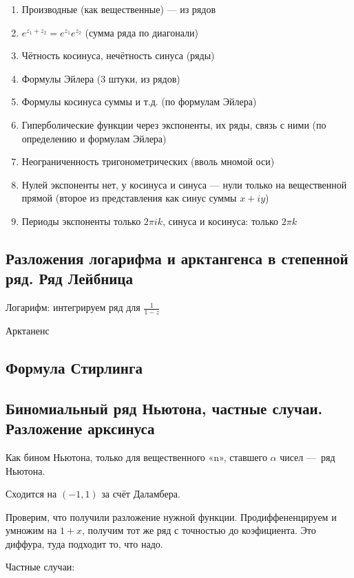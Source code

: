 \documentclass[12pt, a4paper, oneside]{memoir}
\begin{document}
\begin{enumerate}
    \item Производные (как вещественные) — из рядов
    \item $e^{z_1 + z_2} = e^{z_1} e^{z_2}$ (сумма ряда по диагонали)
    \item Чётность косинуса, нечётность синуса (ряды)
    \item Формулы Эйлера (3 штуки, из рядов)
    \item Формулы косинуса суммы и т.д. (по формулам Эйлера)
    \item Гиперболические функции через экспоненты, их ряды, связь с ними (по определению и формулам Эйлера)
    \item Неограниченность тригонометрических (вволь мномой оси)
    \item Нулей экспоненты нет, у косинуса и синуса — нули только на вещественной прямой (второе из представления как синус суммы $x + i y$)
    \item Периоды экспоненты только $2\pi i k$, синуса и косинуса: только $2 \pi k$
\end{enumerate}


\subsection{Разложения логарифма и арктангенса в степенной ряд. Ряд Лейбница}

Логарифм: интегрируем ряд для $\frac{1}{1 - z}$

Арктаненс

\subsection{Формула Стирлинга}



\subsection{Биномиальный ряд Ньютона, частные случаи. Разложение арксинуса}

Как бином Ньютона, только для вещественного «n», ставшего $\alpha$ чисел — ряд Ньютона.

Сходится на $(-1, 1)$ за счёт Даламбера.

Проверим, что получили разложение нужной функции.
Продиффененцируем и умножим на $1 + x$, получим тот же ряд с точностью до коэфициента. Это диффура, туда подходит то, что надо.

Частные случаи:
\end{document}
